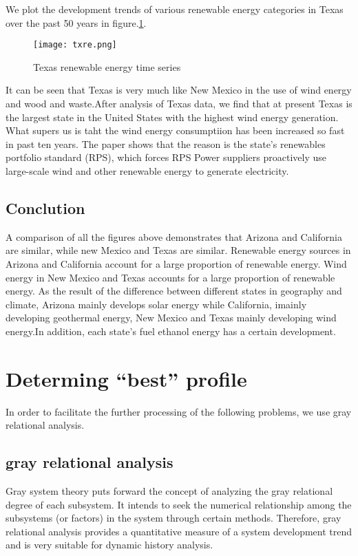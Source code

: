\documentclass{mcmthesis}
\begin{document}
We plot the development trends of various renewable energy categories in Texas over the past 50 years in figure.\ref{fig: Texas renewable energy time series}.
\begin{figure}[htb]
  \centering
  \texttt{[image: txre.png]}
  \caption{Texas renewable energy time series} \label{fig: Texas renewable energy time series}
\end{figure}

It can be seen that Texas is very much like New Mexico in the use of wind energy and wood and waste.After analysis of Texas data, we find that at present Texas is the largest state in the United States with the highest wind energy generation. What supers us is taht the wind energy consumptiion has been increased so fast in past ten years. The paper \cite{Langniss2003The} shows that the reason is the state's renewables portfolio standard (RPS), which forces RPS Power suppliers proactively use large-scale wind and other renewable energy to generate electricity.

\subsection{Conclution}
A comparison of all the figures above demonstrates that Arizona and California are similar, while new Mexico and Texas are similar. Renewable energy sources in Arizona and California account for a large proportion of renewable energy. Wind energy in New Mexico and Texas accounts for a large proportion of renewable energy. As the result of the difference between different states in geography and climate, Arizona mainly develops solar energy while California, imainly developing geothermal energy,  New Mexico and Texas mainly developing wind energy.In addition, each state's fuel ethanol energy has a certain development.

\section{Determing ``best'' profile}
In order to facilitate the further processing of the following problems, we use gray relational analysis.
\subsection{gray relational analysis}
Gray system theory puts forward the concept of analyzing the gray relational degree of each subsystem. It intends to seek the numerical relationship among the subsystems (or factors) in the system through certain methods.
Therefore, gray relational analysis provides a quantitative measure of a system development trend and is very suitable for dynamic history analysis.\cite{AZretime}
\end{document}
